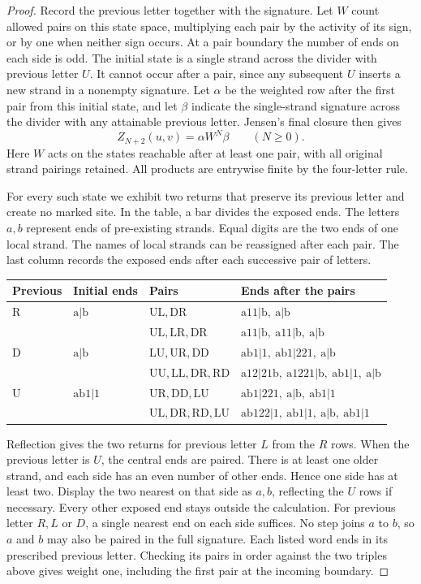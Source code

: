 \begin{proof}
Record the previous letter together with the signature. Let \(W\)
count allowed pairs on this state space, multiplying each pair by
the activity of its sign, or by one when neither sign occurs. At a
pair boundary the number of ends on each side is odd. The initial
state is a single strand across the divider with previous letter
\(U\). It cannot occur after a pair, since any subsequent \(U\)
inserts a new strand in a nonempty signature. Let \(\alpha\) be the
weighted row after the first pair from this initial state, and let
\(\beta\) indicate the single-strand signature across the divider
with any attainable previous letter. Jensen's final closure then gives
\[
                  Z_{N+2}(u,v)=\alpha W^N\beta \qquad (N\ge0).
\]
Here \(W\) acts on the states reachable after at least one pair,
with all original strand pairings retained. All products are
entrywise finite by the four-letter rule.

For every such state we exhibit two returns that preserve its previous
letter and create no marked site. In the table, a bar divides the
exposed ends. The letters \(a,b\) represent ends of pre-existing
strands. Equal digits are the two ends of one local strand. The names
of local strands can be reassigned after each pair. The last column
records the exposed ends after each successive pair of letters.
\begin{center}
\small
\begin{tabular}{@{}llll@{}}
\toprule
Previous & Initial ends & Pairs & Ends after the pairs\\
\midrule
\(\mathrm R\)&\(\mathrm{a|b}\)&
\(\mathrm{UL,DR}\)&\(\mathrm{a11|b,\ a|b}\)\\
& &\(\mathrm{UL,LR,DR}\)&\(\mathrm{a11|b,\ a11|b,\ a|b}\)\\[2pt]
\(\mathrm D\)&\(\mathrm{a|b}\)&
\(\mathrm{LU,UR,DD}\)&\(\mathrm{ab1|1,\ ab1|221,\ a|b}\)\\
& &\(\mathrm{UU,LL,DR,RD}\)&\(\mathrm{a12|21b,\ a1221|b,\ ab1|1,\ a|b}\)\\[2pt]
\(\mathrm U\)&\(\mathrm{ab1|1}\)&
\(\mathrm{UR,DD,LU}\)&\(\mathrm{ab1|221,\ a|b,\ ab1|1}\)\\
& &\(\mathrm{UL,DR,RD,LU}\)&\(\mathrm{ab122|1,\ ab1|1,\ a|b,\ ab1|1}\)\\
\bottomrule
\end{tabular}
\end{center}
Reflection gives the two returns for previous letter \(L\) from the
\(R\) rows. When the previous letter is \(U\), the central ends are
paired. There is at least one older strand, and each side has an even
number of other ends. Hence one side has at least two. Display the
two nearest on that side as \(a,b\), reflecting the \(U\) rows if
necessary. Every other exposed end stays outside the calculation.
For previous letter \(R,L\) or \(D\), a single nearest end on each
side suffices. No step joins \(a\) to \(b\), so \(a\) and \(b\) may
also be paired in the full signature. Each
listed word ends in its prescribed previous letter. Checking its pairs
in order against the two triples above gives weight one, including
the first pair at the incoming boundary.


\end{proof}
